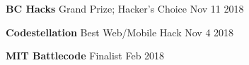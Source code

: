 \documentclass[10pt]{article}
\renewcommand{\date}[2]{#1 #2}
\begin{document}
\begin{minipage}[t]{0.25\textwidth}
\begin{flushleft}
    \textbf{BC Hacks} \newline
    Grand Prize; Hacker's Choice \newline
    \date{Nov 11}{2018}

    \vspace{0.25cm}

    \textbf{Codestellation} \newline
    Best Web/Mobile Hack \newline
    \date{Nov 4}{2018}

    \vspace{0.25cm}

    \textbf{MIT Battlecode} \newline
    Finalist \newline
    \date{Feb}{2018}
  \end{flushleft}
\end{minipage}
\hfill
\end{document}
